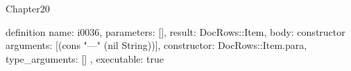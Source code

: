 \begin{lexlean}{Chapter20}
\begin{semanticmodule}
definition{
  name: i0036,
  parameters: [],
  result: DocRows::Item,
  body: constructor{
    arguments: [(cons "---" (nil String))],
    constructor: DocRows::Item.para,
    type_arguments: []
  },
  executable: true
}
\end{semanticmodule}
\end{lexlean}
